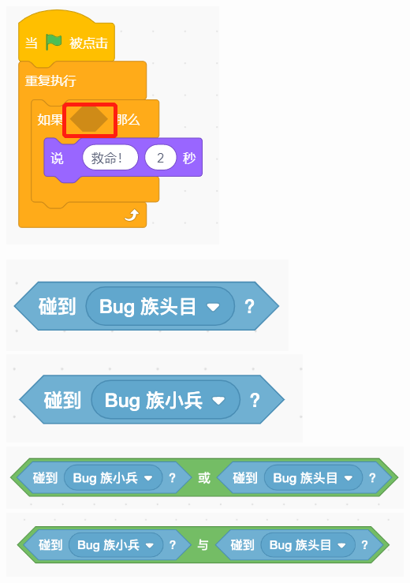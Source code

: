 \documentclass[10pt, a4paper]{article}
\begin{document}
\begin{enumerate}
        \begin{minipage}{.3\textwidth}
            \centering
            \includegraphics[width=.7\textwidth]{16.png}
        \end{minipage}
        \begin{minipage}{.64\textwidth}
            \begin{tasks}
                \task \includegraphics[width=.3\textwidth]{16a.png}
                \task \includegraphics[width=.3\textwidth]{16b.png}
                \task \includegraphics[width=.5\textwidth]{16c.png}
                \task \includegraphics[width=.5\textwidth]{16d.png}
            \end{tasks}
        \end{minipage}


\end{enumerate}
\end{document}

